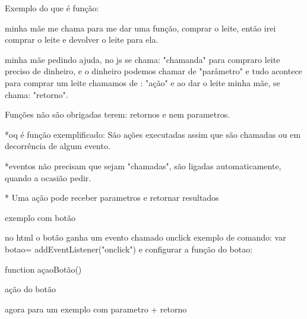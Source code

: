 Exemplo do que é função:

minha mãe me chama para me dar uma função, comprar o leite, então irei comprar o leite e devolver o leite para ela.

minha mãe pedindo ajuda, no js se chama: "chamanda"
para compraro leite preciso de dinheiro, e o dinheiro podemos chamar de "parâmetro"
e tudo acontece para comprar um leite chamamos de : "ação"
e ao dar o leite minha mãe, se chama: "retorno".

Funções não são obrigadas terem: retornos e nem parametros.

*oq é função exemplificado: São ações executadas assim que são chamadas ou em decorrência de algum evento.

*eventos não precisam que sejam "chamadas", são ligadas automaticamente, quando a ocasião pedir.

* Uma ação pode receber parametros e retornar resultados

exemplo com botão{
    no html o botão ganha um evento chamado onclick exemplo de comando:
    var botao= addEventListener("onclick")
    e configurar a função do botao:

    function açaoBotão(){
        
        ação do botão
    }
 
    agora para um exemplo com parametro + retorno 
    
}
